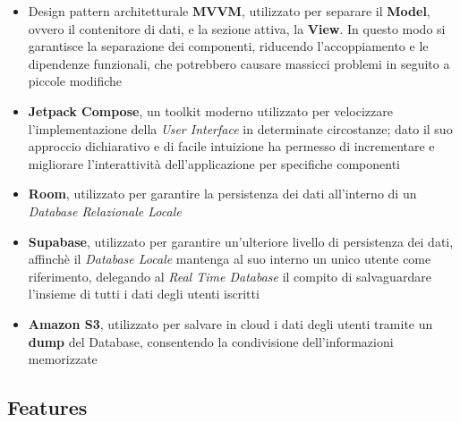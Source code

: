 \documentclass{article}
\begin{document}
    \begin{itemize}
        \renewcommand{\labelitemi}{-}
        \item Design pattern architetturale \textbf{MVVM}, utilizzato per separare il \textbf{Model}, ovvero il contenitore di dati, e la sezione attiva, la \textbf{View}. In questo modo si garantisce la separazione dei componenti, riducendo l'accoppiamento e le dipendenze funzionali, che potrebbero causare massicci problemi in seguito a piccole modifiche
        \item \textbf{Jetpack Compose}, un toolkit moderno utilizzato per velocizzare l'implementazione della \textit{User Interface} in determinate circostanze; dato il suo approccio dichiarativo e di facile intuizione ha permesso di incrementare e migliorare l'interattività dell'applicazione per specifiche componenti
        \item \textbf{Room}, utilizzato per garantire la persistenza dei dati all'interno di un \textit{Database Relazionale Locale}
        \item \textbf{Supabase}, utilizzato per garantire un'ulteriore livello di persistenza dei dati, affinchè il \textit{Database Locale} mantenga al suo interno un unico utente come riferimento, delegando al \textit{Real Time Database} il compito di salvaguardare l'insieme di tutti i dati degli utenti iscritti
        \item \textbf{Amazon S3}, utilizzato per salvare in cloud i dati degli utenti tramite un \textbf{dump} del Database, consentendo la condivisione dell'informazioni memorizzate
    \end{itemize}

    \newpage
    \subsection*{Features}
    \large
\end{document}
